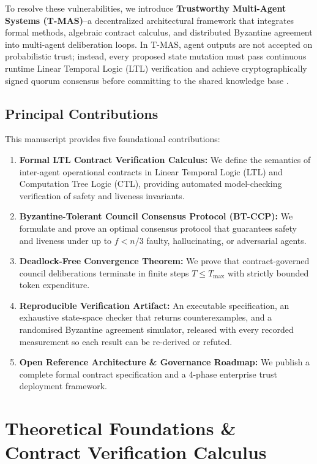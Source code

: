 \documentclass{article}
\begin{document}
To resolve these vulnerabilities, we introduce \textbf{Trustworthy Multi-Agent Systems (T-MAS)}--a decentralized architectural framework that integrates formal methods, algebraic contract calculus, and distributed Byzantine agreement into multi-agent deliberation loops. In T-MAS, agent outputs are not accepted on probabilistic trust; instead, every proposed state mutation must pass continuous runtime Linear Temporal Logic (LTL) verification and achieve cryptographically signed quorum consensus before committing to the shared knowledge base \cite{crossref_10_1109_access_2026_3656309,crossref_10_18653_v1_2026_findings_acl_1933}.


\subsection{Principal Contributions}


This manuscript provides five foundational contributions:
\begin{enumerate}
  \item \textbf{Formal LTL Contract Verification Calculus:} We define the semantics of inter-agent operational contracts in Linear Temporal Logic (LTL) and Computation Tree Logic (CTL), providing automated model-checking verification of safety and liveness invariants.
  \item \textbf{Byzantine-Tolerant Council Consensus Protocol (BT-CCP):} We formulate and prove an optimal consensus protocol that guarantees safety and liveness under up to $f < n/3$ faulty, hallucinating, or adversarial agents.
  \item \textbf{Deadlock-Free Convergence Theorem:} We prove that contract-governed council deliberations terminate in finite steps $T \le T_{\max}$ with strictly bounded token expenditure.
  \item \textbf{Reproducible Verification Artifact:} An executable specification, an exhaustive state-space checker that returns counterexamples, and a randomised Byzantine agreement simulator, released with every recorded measurement so each result can be re-derived or refuted.
  \item \textbf{Open Reference Architecture \& Governance Roadmap:} We publish a complete formal contract specification and a 4-phase enterprise trust deployment framework.
\end{enumerate}




\section{Theoretical Foundations \& Contract Verification Calculus}
\end{document}
